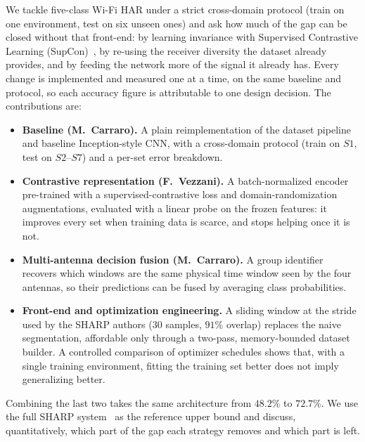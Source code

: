 We tackle five-class Wi-Fi HAR under a strict cross-domain protocol (train on
one environment, test on six unseen ones) and ask how much of the gap can be
closed without that front-end: by learning invariance with
Supervised Contrastive Learning (SupCon)~\cite{supcon},
by re-using the receiver diversity the dataset already provides, and by feeding
the network more of the signal it already has. Every change is implemented and
measured one at a time, on the same baseline and protocol, so each
accuracy figure is attributable to one design decision. The contributions are:
\begin{itemize}
  \item \textbf{Baseline (M.~Carraro).} A plain reimplementation
  of the dataset pipeline and baseline Inception-style CNN, with a cross-domain
  protocol (train on $S1$, test on $S2$--$S7$) and a per-set error breakdown.
  \item \textbf{Contrastive representation (F.~Vezzani).} A batch-normalized
  encoder pre-trained with a supervised-contrastive loss and domain-randomization
  augmentations, evaluated with a linear probe on the frozen features: it
  improves every set when training data is scarce, and stops helping once it is
  not.
  \item \textbf{Multi-antenna decision fusion (M.~Carraro).} A group identifier 
  recovers which windows are the same physical time
  window seen by the four antennas, so their predictions can be fused by
  averaging class probabilities.
  \item \textbf{Front-end and optimization engineering.} A sliding window at the
  stride used by the SHARP authors ($30$ samples, $91\%$ overlap) replaces the
  naive segmentation, affordable only through a two-pass, memory-bounded 
  dataset builder. A controlled comparison of optimizer
  schedules shows that, with a single training environment, fitting the training
  set better does not imply generalizing better.
\end{itemize}
Combining the last two takes the same architecture from $48.2\%$ to
$\mathbf{72.7\%}$. We use the full SHARP system~\cite{sharp} as the reference
upper bound and discuss, quantitatively, which part of the gap each strategy
removes and which part is left.
